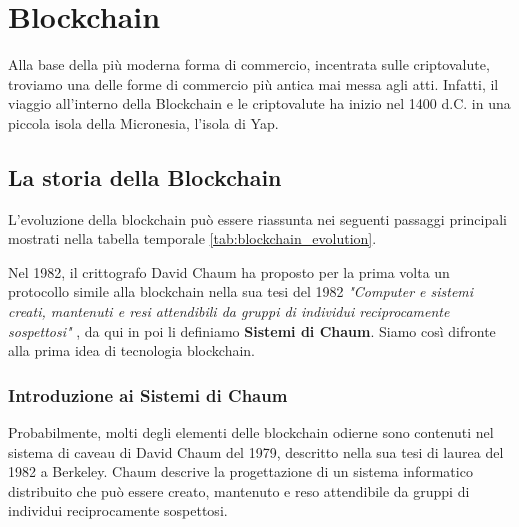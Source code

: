 \chapter{Blockchain}
\label{chap:blockchain}
Alla base della più moderna forma di commercio, incentrata sulle criptovalute, troviamo una delle forme di commercio più antica mai messa agli atti. Infatti, il viaggio all'interno della Blockchain e le criptovalute ha inizio nel 1400 d.C. in una piccola isola della Micronesia, l'isola di Yap.

\section{La storia della Blockchain}

L'evoluzione della blockchain può essere riassunta nei seguenti passaggi principali mostrati nella tabella temporale \ref{tab:blockchain_evolution}.

Nel 1982, il crittografo David Chaum ha proposto per la prima volta un protocollo simile alla blockchain nella sua tesi del 1982 \textit{"Computer e sistemi creati, mantenuti e resi attendibili da gruppi di individui reciprocamente sospettosi"} \cite{computer_systems_chaum}, da qui in poi li definiamo \textbf{Sistemi di Chaum}. Siamo così difronte alla prima idea di tecnologia blockchain.

\begin{table}[htbp]
  \centering
  \caption{Evoluzione della Blockchain}
  \label{tab:blockchain_evolution}
\end{table}

\subsection{Introduzione ai Sistemi di Chaum}
Probabilmente, molti degli elementi delle blockchain odierne sono contenuti nel sistema di caveau di David Chaum del 1979, descritto nella sua tesi di laurea del 1982 a Berkeley. Chaum descrive la progettazione di un sistema informatico distribuito che può essere creato, mantenuto e reso attendibile da gruppi di individui reciprocamente sospettosi.

